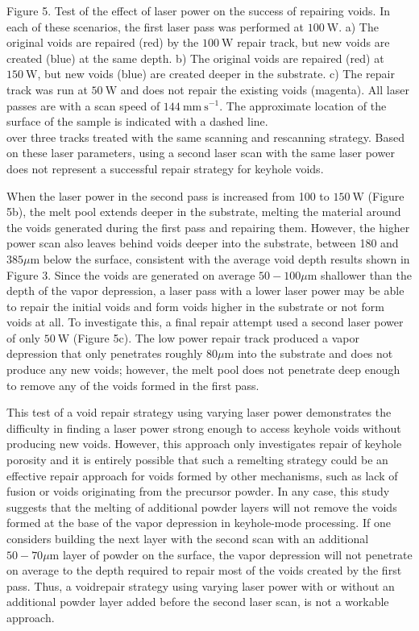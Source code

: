 \documentclass[10pt]{article}
\begin{document}
Figure 5. Test of the effect of laser power on the success of repairing voids. In each of these scenarios, the first laser pass was performed at $100 \mathrm{~W}$. a) The original voids are repaired (red) by the $100 \mathrm{~W}$ repair track, but new voids are created (blue) at the same depth. b) The original voids are repaired (red) at $150 \mathrm{~W}$, but new voids (blue) are created deeper in the substrate. c) The repair track was run at $50 \mathrm{~W}$ and does not repair the existing voids (magenta). All laser passes are with a scan speed of $144 \mathrm{~mm} \mathrm{~s}^{-1}$. The approximate location of the surface of the sample is indicated with a dashed line.\\
over three tracks treated with the same scanning and rescanning strategy. Based on these laser parameters, using a second laser scan with the same laser power does not represent a successful repair strategy for keyhole voids.

When the laser power in the second pass is increased from 100 to $150 \mathrm{~W}$ (Figure 5b), the melt pool extends deeper in the substrate, melting the material around the voids generated during the first pass and repairing them. However, the higher power scan also leaves behind voids deeper into the substrate, between 180 and $385 \mu \mathrm{m}$ below the surface, consistent with the average void depth results shown in Figure 3. Since the voids are generated on average $50-100 \mu \mathrm{m}$ shallower than the depth of the vapor depression, a laser pass with a lower laser power may be able to repair the initial voids and form voids higher in the substrate or not form voids at all. To investigate this, a final repair attempt used a second laser power of only $50 \mathrm{~W}$ (Figure 5c). The low power repair track produced a vapor depression that only penetrates roughly $80 \mu \mathrm{m}$ into the substrate and does not produce any new voids; however, the melt pool does not penetrate deep enough to remove any of the voids formed in the first pass.

This test of a void repair strategy using varying laser power demonstrates the difficulty in finding a laser power strong enough to access keyhole voids without producing new voids. However, this approach only investigates repair of keyhole porosity and it is entirely possible that such a remelting strategy could be an effective repair approach for voids formed by other mechanisms, such as lack of fusion or voids originating from the precursor powder. In any case, this study suggests that the melting of additional powder layers will not remove the voids formed at the base of the vapor depression in keyhole-mode processing. If one considers building the next layer with the second scan with an additional $50-70 \mu \mathrm{m}$ layer of powder on the surface, the vapor depression will not penetrate on average to the depth required to repair most of the voids created by the first pass. Thus, a voidrepair strategy using varying laser power with or without an additional powder layer added before the second laser scan, is not a workable approach.
\end{document}

